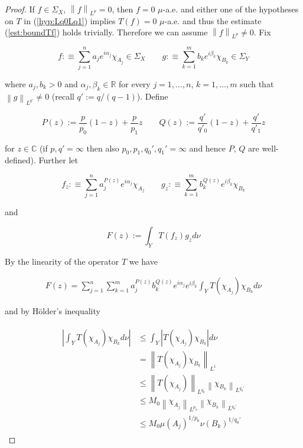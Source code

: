 \begin{proof}
	If $f \in \Sigma_X$, $\left\| f \right\|_{L^p} = 0$, then $f = 0$ $\mu$-a.e. and either one of the hypotheses on $T$ in (\ref{hyp:Lq0Lq1}) implies $T(f) = 0$ $\mu$-a.e. and thus the estimate (\ref{est:boundTf}) holds trivially. Therefore we can assume $\left\| f\right\|_{L^p} \neq 0$. Fix 
	
\begin{equation*}
	f :\equiv \sum_{j = 1}^n a_j e^{i\alpha_j}\chi_{A_j} \in \Sigma_X \qquad g :\equiv \sum_{k = 1}^m b_k e^{i\beta_k}\chi_{B_k} \in \Sigma_Y
\end{equation*}

where $a_j, b_k > 0$ and $\alpha_j, \beta_k \in \mathbb{R}$ for every $j = 1,\hdots,n$, $k = 1,\hdots,m$ such that $\left\| g\right\|_{L^{q'}} \neq 0$ (recall $q' := q/\left( q - 1 \right)$). Define

\begin{equation*}
	P(z) := \frac{p}{p_0}(1 - z) + \frac{p}{p_1}z \qquad Q(z) := \frac{q'}{q'_0}(1 - z) + \frac{q'}{q'_1}z
\end{equation*}

for $z \in \mathbb{C}$ (if $p,q' = \infty$ then also $p_0,p_1,q_0',q_1' = \infty $ and hence $P$, $Q$ are well-defined). Further let
				
\begin{equation}
	f_z :\equiv \sum_{j = 1}^n a^{P(z)}_j e^{i\alpha_j}\chi_{A_j} \qquad g_z :\equiv  \sum_{k = 1}^m b^{Q(z)}_k e^{i\beta_k}\chi_{B_k}
	\label{def:fzgz}
\end{equation}
				
and 

\begin{equation}
	F(z) := \int_Y T(f_z)g_zd\nu
	\label{eq:def_F}
\end{equation}

By the linearity of the operator $T$ we have

\begin{gather*}
	F(z) = \sum_{j = 1}^n\sum_{k = 1}^m a^{P(z)}_j b_k^{Q(z)} e^{i\alpha_j} e^{i\beta_k} \int_YT(\chi_{A_j})\chi_{B_k}d\nu
\end{gather*}

and by H\"older's inequality

\begin{gather}
	\begin{aligned}
		\left| \int_YT(\chi_{A_j})\chi_{B_k}d\nu \right| &\leqslant \int_Y\left| T(\chi_{A_j})\chi_{B_k}\right|d\nu\\
		&= \left\|T(\chi_{A_j})\chi_{B_k}\right\|_{L^1}\\
		&\leqslant \left\|T(\chi_{A_j})\right\|_{L^{q_0}} \left\|\chi_{B_k}\right\|_{L^{q_0'}}\\
		&\leqslant M_0\left\|\chi_{A_j}\right\|_{L^{p_0}} \left\|\chi_{B_k}\right\|_{L^{q_0'}}\\
		&\leqslant M_0 \mu\left(A_j\right)^{1/p_0}\nu\left(B_k\right)^{1/q_0'}
	\end{aligned}
	\label{est:constant_F}
\end{gather}


\end{proof}
